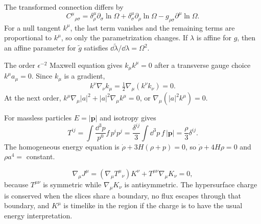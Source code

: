 \begin{solutions}
\begin{solution}
The transformed connection differs by
\[
C^\mu{}_{\rho\sigma}
=\delta^\mu_\rho\partial_\sigma\ln\Omega
+\delta^\mu_\sigma\partial_\rho\ln\Omega
-g_{\rho\sigma}\partial^\mu\ln\Omega.
\]
For a null tangent \(k^\mu\), the last term vanishes and the remaining terms
are proportional to \(k^\mu\), so only the parametrization changes.  If
\(\lambda\) is affine for \(g\), then an affine parameter for
\(\widetilde g\) satisfies
\(\dd\widetilde\lambda/\dd\lambda=\Omega^2\).
\end{solution}

\begin{solution}
The order \(\epsilon^{-2}\) Maxwell equation gives \(k_\mu k^\mu=0\) after a
transverse gauge choice \(k^\mu a_\mu=0\).  Since \(k_\mu\) is a gradient,
\[
k^\nu\nabla_\nu k_\mu
=\tfrac12\nabla_\mu(k^\nu k_\nu)=0.
\]
At the next order,
\(k^\mu\nabla_\mu |a|^2+|a|^2\nabla_\mu k^\mu=0\), or
\(\nabla_\mu(|a|^2k^\mu)=0\).
\end{solution}

\begin{solution}
For massless particles \(E=|\bm p|\) and isotropy gives
\[
T^{ij}=\int\frac{\dd^3p}{p^0}f\,p^ip^j
=\frac{\delta^{ij}}3\int\dd^3p\,f\,|\bm p|
=\frac{\rho}{3}\delta^{ij}.
\]
The homogeneous energy equation is
\(\dot\rho+3H(\rho+p)=0\), so
\(\dot\rho+4H\rho=0\) and \(\rho a^4=\) constant.
\end{solution}

\begin{solution}
\[
\nabla_\mu J^\mu
=(\nabla_\mu T^\mu{}_\nu)K^\nu
+T^{\mu\nu}\nabla_\mu K_\nu=0,
\]
because \(T^{\mu\nu}\) is symmetric while
\(\nabla_\mu K_\nu\) is antisymmetric.  The hypersurface charge is conserved
when the slices share a boundary, no flux escapes through that boundary, and
\(K^\mu\) is timelike in the region if the charge is to have the usual energy
interpretation.
\end{solution}



\end{solutions}
